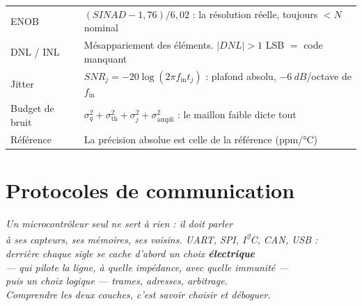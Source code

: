 \documentclass[12pt,a4paper,twoside]{book}
\begin{document}
\begin{ingenieur}[title={\color{white} Résumé --- Niveau Ingénieur}]
\begin{center}
\renewcommand{\arraystretch}{1.3}
\begin{tabular}{p{3.5cm}p{9.5cm}}
\toprule
ENOB & $(SINAD-1{,}76)/6{,}02$ : la résolution réelle, toujours $< N$ nominal \\
DNL / INL & Mésappariement des éléments. $|DNL|>1$ LSB $=$ code manquant \\
Jitter & $SNR_j = -20\log(2\pi f_{\text{in}} t_j)$ : plafond absolu, $-\SI{6}{dB}$/octave de $f_{\text{in}}$ \\
Budget de bruit & $\sigma_q^2 + \sigma_{\text{th}}^2 + \sigma_j^2 + \sigma_{\text{ampli}}^2$ : le maillon faible dicte tout \\
Référence & La précision absolue est celle de la référence (ppm/°C) \\
\bottomrule
\end{tabular}
\end{center}
\end{ingenieur}


\chapter{Protocoles de communication}

\begin{center}
\textit{Un microcontrôleur seul ne sert à rien : il doit parler\\
à ses capteurs, ses mémoires, ses voisins. UART, SPI, I\textsuperscript{2}C, CAN, USB :\\
derrière chaque sigle se cache d'abord un choix \textbf{électrique}\\
--- qui pilote la ligne, à quelle impédance, avec quelle immunité ---\\
puis un choix logique --- trames, adresses, arbitrage.\\
Comprendre les deux couches, c'est savoir choisir et déboguer.}
\end{center}

\vspace{0.5cm}
\end{document}
